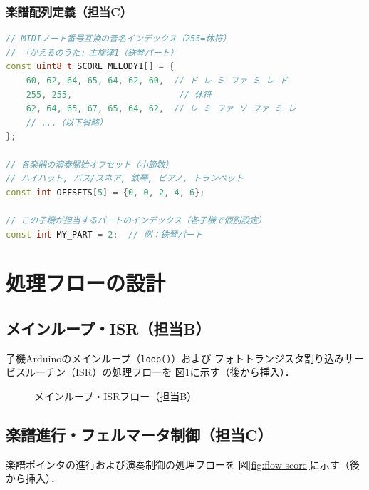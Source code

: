 \subsubsection*{楽譜配列定義（担当C）}

\begin{lstlisting}[language=C++, caption=楽譜配列・輪唱オフセット定義（抜粋）]
// MIDIノート番号互換の音名インデックス（255=休符）
// 「かえるのうた」主旋律1（鉄琴パート）
const uint8_t SCORE_MELODY1[] = {
    60, 62, 64, 65, 64, 62, 60,  // ド レ ミ ファ ミ レ ド
    255, 255,                     // 休符
    62, 64, 65, 67, 65, 64, 62,  // レ ミ ファ ソ ファ ミ レ
    // ...（以下省略）
};

// 各楽器の演奏開始オフセット（小節数）
// ハイハット, バス/スネア, 鉄琴, ピアノ, トランペット
const int OFFSETS[5] = {0, 0, 2, 4, 6};

// この子機が担当するパートのインデックス（各子機で個別設定）
const int MY_PART = 2;  // 例：鉄琴パート
\end{lstlisting}

\section{処理フローの設計}

\subsection*{メインループ・ISR（担当B）}

子機Arduinoのメインループ（\texttt{loop()}）および
フォトトランジスタ割り込みサービスルーチン（ISR）の処理フローを
図\ref{fig:flow-main}に示す（後から挿入）．

\begin{figure}[H]
  \centering
  \caption{メインループ・ISRフロー（担当B）}
  \label{fig:flow-main}
\end{figure}

\subsection*{楽譜進行・フェルマータ制御（担当C）}

楽譜ポインタの進行および演奏制御の処理フローを
図\ref{fig:flow-score}に示す（後から挿入）．

